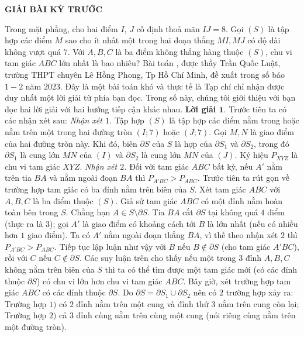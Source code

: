 \newpage
\centerline{{\large{\textbf{\color{thachthuctoanhoc}\color{thachthuctoanhoc}GIẢI BÀI KỲ TRƯỚC}}}}
\vspace*{-5pt}
\begin{multicols}{2}
	{}
	Trong mặt phẳng, cho hai điểm $I$, $J$ cố định thoả mãn $IJ=8$.  Gọi $(S)$ là tập hợp các điểm $M$ sao cho ít nhất một trong hai đoạn thẳng $MI,MJ$ có độ dài không vượt quá $7$. Với $A,B,C$ là ba điểm không thẳng hàng thuộc $(S)$, chu vi tam giác $ABC$ lớn nhất là bao nhiêu?
	\vskip 0.05cm
	Bài toán {}, được thầy Trần Quốc Luật, trường THPT chuyên Lê Hồng Phong, Tp Hồ Chí Minh, đề xuất trong số báo $1-2$ năm $2023$. Đây là một bài toán khó và thực tế là Tạp chí chỉ nhận được duy nhất một lời giải từ phía bạn đọc. Trong số này, chúng tôi giới thiệu với bạn đọc hai lời giải với hai hướng tiếp cận khác nhau. 
	\vskip 0.05cm
	\textbf{\color{thachthuctoanhoc}Lời giải $\pmb{1.}$} Trước tiên ta có các nhận xét sau:
	\vskip 0.05cm
	\textit{Nhận xét $1$.} Tập hợp $(S)$ là tập hợp các điểm nằm trong hoặc nằm trên một trong hai đường tròn $(I;7)$ hoặc $(J;7)$. 
	\vskip 0.05cm
	Gọi $M,N$ là giao điểm của hai đường tròn này. Khi đó, biên $\partial S$ của $S$ là hợp của $\partial S_1$ và $\partial S_2$, trong đó $\partial S_1$ là cung lớn $MN$ của $(I)$ và $\partial S_2$ là cung lớn $MN$ của $(J)$.
 	\vskip 0.05cm	
	Ký hiệu $P_{XYZ}$ là chu vi tam giác $XYZ$.
	\vskip 0.05cm
	\textit{Nhận xét $2$.} Đối với tam giác $ABC$ bất kỳ, nếu $A'$ nằm trên tia $BA$ và nằm ngoài đoạn $BA$ thì $P_{A'BC}> P_{ABC}$. 
	\vskip 0.05cm
	Trước tiên ta rút gọn về trường hợp tam giác có ba đỉnh nằm trên biên của $S$.
	\vskip 0.05cm
	Xét tam giác $ABC$ với $A,B,C$ là ba điểm thuộc $(S)$. Giả sử tam giác $ABC$ có một đỉnh nằm hoàn toàn bên trong $S$. Chẳng hạn $A\in S\setminus \partial S$. Tia $BA$ cắt $\partial S$ tại không quá $4$ điểm (thực ra là $3$); gọi $A'$ là giao điểm có khoảng cách tới $B$ là lớn nhất (nếu có nhiều hơn $1$ giao điểm). Ta có $A'$ nằm ngoài đoạn thẳng $BA$, vì thế theo nhận xét $2$ thì $P_{A'BC}> P_{ABC}$. Tiếp tục lập luận như vậy với $B$ nếu $B\notin \partial S$ (cho tam giác $A'BC$), rồi với $C$ nếu $C\notin \partial S$. Các suy luận trên cho thấy nếu một trong $3$ đỉnh $A, B, C$ không nằm trên biên của $S$ thì ta có thể tìm được một tam giác mới (có các đỉnh thuộc $\partial S$) có chu vi lớn hơn chu vi tam giác $ABC$.
	\vskip 0.05cm
	Bây giờ, xét trường hợp tam giác $ABC$ có các đỉnh thuộc $\partial S$. Do $\partial S = \partial S_1 \cup \partial S_2$ nên có $2$ trường hợp xảy ra: Trường hợp $1)$ có $2$ đỉnh nằm trên một cung và đỉnh thứ $3$ nằm trên cung còn lại; Trường hợp $2)$ cả $3$ đỉnh cùng nằm trên cùng một cung (nói riêng cùng nằm trên một đường tròn).

\end{multicols}
